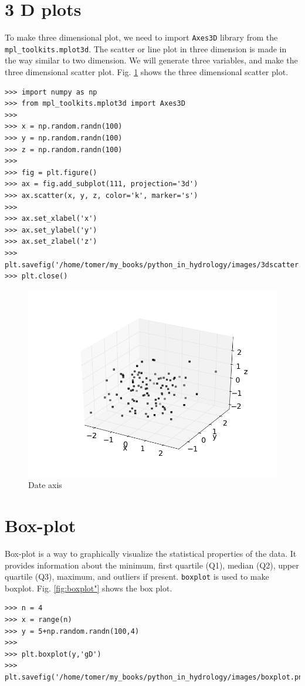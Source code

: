 \documentclass[10pt]{book}
\begin{document}
\section{3 D plots}
To make three dimensional plot, we need to import \verb"Axes3D" library from the \verb"mpl_toolkits.mplot3d". The scatter or line plot in three dimension is made in the way similar to two dimension. We will generate three variables, and make the three dimensional scatter plot. Fig. \ref{fig:3dscatter} shows the three dimensional scatter plot. 
\beforeverb \begin{verbatim}
>>> import numpy as np
>>> from mpl_toolkits.mplot3d import Axes3D
>>> 
>>> x = np.random.randn(100)
>>> y = np.random.randn(100)
>>> z = np.random.randn(100)
>>> 
>>> fig = plt.figure()
>>> ax = fig.add_subplot(111, projection='3d')
>>> ax.scatter(x, y, z, color='k', marker='s')
>>> 
>>> ax.set_xlabel('x')
>>> ax.set_ylabel('y')
>>> ax.set_zlabel('z')
>>> plt.savefig('/home/tomer/my_books/python_in_hydrology/images/3dscatter.png')
>>> plt.close()
\end{verbatim} \afterverb
{}

\beforefig
\begin{figure}[h!]
  \centering
    \includegraphics[scale=0.5]{images/3dscatter.png}
  \caption{Date axis}
   \label{fig:3dscatter}
\end{figure}
\afterfig

\section{Box-plot}
Box-plot is a way to graphically visualize the statistical properties of the data. It provides information about the minimum, first quartile (Q1), median (Q2), upper quartile (Q3), maximum, and outliers if present. \verb"boxplot" is used to make boxplot. Fig. \ref{fig:boxplot"} shows the box plot. 
\beforeverb \begin{verbatim}
>>> n = 4
>>> x = range(n)
>>> y = 5+np.random.randn(100,4)
>>> 
>>> plt.boxplot(y,'gD')
>>> plt.savefig('/home/tomer/my_books/python_in_hydrology/images/boxplot.png')
\end{verbatim} \afterverb
\end{document}
